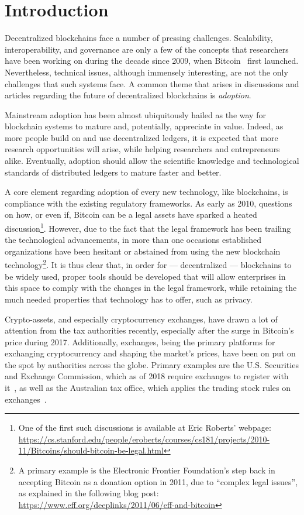 \section{Introduction}\label{sec:introduction}

Decentralized blockchains face a number of pressing challenges.
Scalability, interoperability, and governance are only a few of the concepts
that researchers have been working on during the decade since 2009, when
Bitcoin~\cite{nakamoto2008bitcoin} first launched. Nevertheless, technical
issues, although immensely interesting, are not the only challenges that such
systems face. A common theme that arises in discussions and articles regarding
the future of decentralized blockchains is \emph{adoption}.

Mainstream adoption has been almost ubiquitously hailed as the way for
blockchain systems to mature and, potentially, appreciate in value. Indeed, as
more people build on and use decentralized ledgers, it is expected that more
research opportunities will arise, while helping researchers and entrepreneurs
alike. Eventually, adoption should allow the scientific knowledge and
technological standards of distributed ledgers to mature faster and better.

A core element regarding adoption of every new technology, like blockchains, is
compliance with the existing regulatory frameworks. As early as 2010, questions
on how, or even if, Bitcoin can be a legal assets have sparked a heated
discussion\footnote{One of the first such discussions is available at Eric
Roberts' webpage:
\url{https://cs.stanford.edu/people/eroberts/courses/cs181/projects/2010-11/Bitcoins/should-bitcoin-be-legal.html}}.
However, due to the fact that the legal framework has been trailing the
technological advancements, in more than one occasions established
organizations have been hesitant or abstained from using the new blockchain
technology\footnote{A primary example is the Electronic Frontier Foundation's
step back in accepting Bitcoin as a donation option in 2011, due to ``complex
legal issues'', as explained in the following blog post:
\url{https://www.eff.org/deeplinks/2011/06/eff-and-bitcoin}}. It is thus clear
that, in order for --- decentralized --- blockchains to be widely used, proper
tools should be developed that will allow enterprises in this space to comply
with the changes in the legal framework, while retaining the much needed
properties that technology has to offer, such as privacy.

Crypto-assets, and especially cryptocurrency exchanges, have drawn a lot of
attention from the tax authorities recently, especially after the surge in
Bitcoin's price during 2017. Additionally, exchanges, being the primary
platforms for exchanging cryptocurrency and shaping the market's prices, have
been on put on the spot by authorities across the globe. Primary examples are
the U.S. Securities and Exchange Commission, which as of 2018 require exchanges
to register with it~\cite{securities2018statement}, as well as the Australian
tax office, which applies the trading stock rules on
exchanges~\cite{tax2019statement}.

